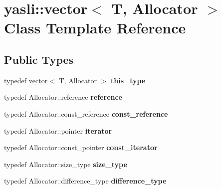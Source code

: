 \hypertarget{classyasli_1_1vector}{}\section{yasli\+:\+:vector$<$ T, Allocator $>$ Class Template Reference}
\label{classyasli_1_1vector}
\subsection*{Public Types}
\begin{DoxyCompactItemize}
\item 
\hypertarget{classyasli_1_1vector_ab1320e98b33e06f51472670dea2fa045}{}typedef \hyperlink{classyasli_1_1vector}{vector}$<$ T, Allocator $>$ {\bfseries this\+\_\+type}\label{classyasli_1_1vector_ab1320e98b33e06f51472670dea2fa045}

\item 
\hypertarget{classyasli_1_1vector_aa2d8fb1e9a4c97e2876c4fa35c7b8cca}{}typedef Allocator\+::reference {\bfseries reference}\label{classyasli_1_1vector_aa2d8fb1e9a4c97e2876c4fa35c7b8cca}

\item 
\hypertarget{classyasli_1_1vector_a1aa9543853ffaebd302ad1767c0100a7}{}typedef Allocator\+::const\+\_\+reference {\bfseries const\+\_\+reference}\label{classyasli_1_1vector_a1aa9543853ffaebd302ad1767c0100a7}

\item 
\hypertarget{classyasli_1_1vector_a336780b2228efa48412e6a7cd5b8dbb2}{}typedef Allocator\+::pointer {\bfseries iterator}\label{classyasli_1_1vector_a336780b2228efa48412e6a7cd5b8dbb2}

\item 
\hypertarget{classyasli_1_1vector_aaee3bd4941fb65d9823f2051eaea2d57}{}typedef Allocator\+::const\+\_\+pointer {\bfseries const\+\_\+iterator}\label{classyasli_1_1vector_aaee3bd4941fb65d9823f2051eaea2d57}

\item 
\hypertarget{classyasli_1_1vector_a279c2cf88c4a7ca6cf1bcd791acdabfa}{}typedef Allocator\+::size\+\_\+type {\bfseries size\+\_\+type}\label{classyasli_1_1vector_a279c2cf88c4a7ca6cf1bcd791acdabfa}

\item 
\hypertarget{classyasli_1_1vector_aa3bd401a64f02edfbb61c8bb52c37fb0}{}typedef Allocator\+::difference\+\_\+type {\bfseries difference\+\_\+type}\label{classyasli_1_1vector_aa3bd401a64f02edfbb61c8bb52c37fb0}


\end{DoxyCompactItemize}
